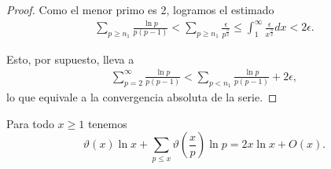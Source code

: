 \begin{proof}
Como el menor primo es 2, logramos el estimado 
\begin{align}
\sum_{p \geq n_1} \frac{\ln p}{p (p - 1)} <  \sum_{p \geq n_1} \frac{\epsilon}{p^\frac{3}{2}} \le \int_{1}^\infty \frac{\epsilon}{x^\frac{3}{2}} dx  < 2 \epsilon. 
\end{align}

Esto, por supuesto, lleva a 
\begin{align}
\sum_{p = 2}^\infty \frac{\ln p}{p (p - 1)} < \sum_{p < n_1} \frac{\ln p}{p (p - 1)} + 2 \epsilon, 
\end{align}
lo que equivale a la convergencia absoluta de la serie. 
\end{proof}

\begin{lemma}\label{lem20}
Para todo $x \geq 1$ tenemos
\[
\vartheta(x)\ln x + \sum_{p \leq x} \vartheta\left(\frac{x}{p}\right)\ln p = 2x\ln x + O(x).
\]
\end{lemma}

